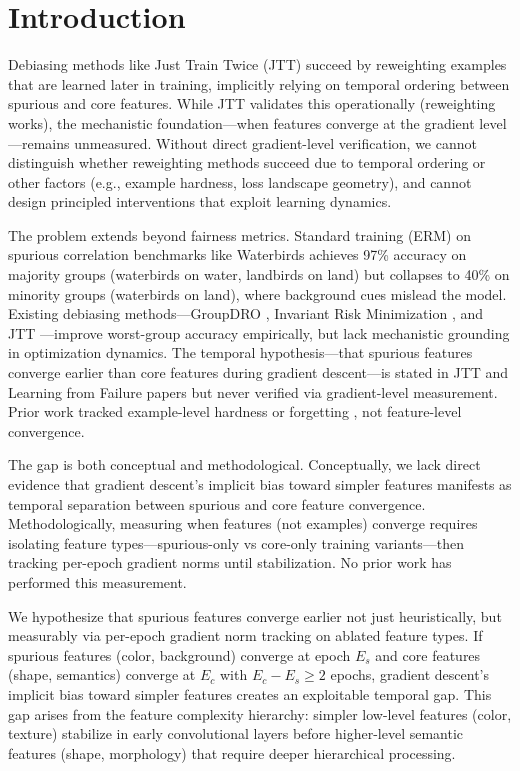 \section{Introduction}

Debiasing methods like Just Train Twice (JTT) \cite{nam2020learning} succeed by reweighting examples that are learned later in training, implicitly relying on temporal ordering between spurious and core features. While JTT validates this operationally (reweighting works), the mechanistic foundation---when features converge at the gradient level---remains unmeasured. Without direct gradient-level verification, we cannot distinguish whether reweighting methods succeed due to temporal ordering or other factors (e.g., example hardness, loss landscape geometry), and cannot design principled interventions that exploit learning dynamics.

The problem extends beyond fairness metrics. Standard training (ERM) on spurious correlation benchmarks like Waterbirds \cite{sagawa2020distributionally} achieves 97\% accuracy on majority groups (waterbirds on water, landbirds on land) but collapses to 40\% on minority groups (waterbirds on land), where background cues mislead the model. Existing debiasing methods---GroupDRO \cite{sagawa2020distributionally}, Invariant Risk Minimization \cite{arjovsky2019invariant}, and JTT \cite{nam2020learning}---improve worst-group accuracy empirically, but lack mechanistic grounding in optimization dynamics. The temporal hypothesis---that spurious features converge earlier than core features during gradient descent---is stated in JTT and Learning from Failure \cite{liu2021just} papers but never verified via gradient-level measurement. Prior work tracked example-level hardness or forgetting \cite{toneva2018empirical}, not feature-level convergence.

The gap is both conceptual and methodological. Conceptually, we lack direct evidence that gradient descent's implicit bias toward simpler features \cite{soudry2018implicit} manifests as temporal separation between spurious and core feature convergence. Methodologically, measuring when features (not examples) converge requires isolating feature types---spurious-only vs core-only training variants---then tracking per-epoch gradient norms until stabilization. No prior work has performed this measurement.

We hypothesize that spurious features converge earlier not just heuristically, but measurably via per-epoch gradient norm tracking on ablated feature types. If spurious features (color, background) converge at epoch $E_s$ and core features (shape, semantics) converge at $E_c$ with $E_c - E_s \geq 2$ epochs, gradient descent's implicit bias toward simpler features creates an exploitable temporal gap. This gap arises from the feature complexity hierarchy: simpler low-level features (color, texture) stabilize in early convolutional layers before higher-level semantic features (shape, morphology) that require deeper hierarchical processing.

